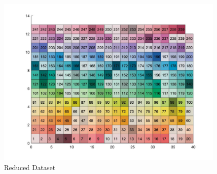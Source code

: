 \documentclass{article}
\begin{document}
\begin{figure}
  \includegraphics[width=\linewidth]{img/reducteddataset.jpg}
  \caption{Reduced Dataset}
  \label{fig:reducteddataset}
\end{figure}
\end{document}
